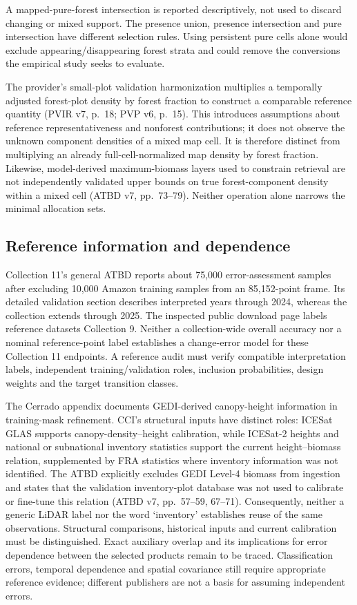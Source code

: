 \documentclass[11pt,a4paper]{article}
\begin{document}
A mapped-pure-forest intersection is reported descriptively, not used to discard changing or mixed support. The presence union, presence intersection and pure intersection have different selection rules. Using persistent pure cells alone would exclude appearing/disappearing forest strata and could remove the conversions the empirical study seeks to evaluate.

The provider's small-plot validation harmonization multiplies a temporally adjusted forest-plot density by forest fraction to construct a comparable reference quantity (PVIR v7, p.~18; PVP v6, p.~15). This introduces assumptions about reference representativeness and nonforest contributions; it does not observe the unknown component densities of a mixed map cell. It is therefore distinct from multiplying an already full-cell-normalized map density by forest fraction. Likewise, model-derived maximum-biomass layers used to constrain retrieval are not independently validated upper bounds on true forest-component density within a mixed cell (ATBD v7, pp.~73--79). Neither operation alone narrows the minimal allocation sets.

\subsection{Reference information and dependence}
Collection 11's general ATBD reports about 75,000 error-assessment samples after excluding 10,000 Amazon training samples from an 85,152-point frame. Its detailed validation section describes interpreted years through 2024, whereas the collection extends through 2025. The inspected public download page labels reference datasets Collection 9. Neither a collection-wide overall accuracy nor a nominal reference-point label establishes a change-error model for these Collection 11 endpoints. A reference audit must verify compatible interpretation labels, independent training/validation roles, inclusion probabilities, design weights and the target transition classes.

The Cerrado appendix documents GEDI-derived canopy-height information in training-mask refinement. CCI's structural inputs have distinct roles: ICESat GLAS supports canopy-density--height calibration, while ICESat-2 heights and national or subnational inventory statistics support the current height--biomass relation, supplemented by FRA statistics where inventory information was not identified. The ATBD explicitly excludes GEDI Level-4 biomass from ingestion and states that the validation inventory-plot database was not used to calibrate or fine-tune this relation (ATBD v7, pp.~57--59, 67--71). Consequently, neither a generic LiDAR label nor the word `inventory' establishes reuse of the same observations. Structural comparisons, historical inputs and current calibration must be distinguished. Exact auxiliary overlap and its implications for error dependence between the selected products remain to be traced. Classification errors, temporal dependence and spatial covariance still require appropriate reference evidence; different publishers are not a basis for assuming independent errors.
\end{document}
